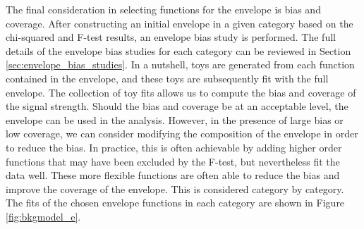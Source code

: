 The final consideration in selecting functions for the envelope is bias and coverage. After constructing an initial envelope in a given 
category based on the chi-squared and F-test results, an envelope bias study is performed. The full details of the envelope 
bias studies for each category can be reviewed in Section \ref{sec:envelope_bias_studies}. In a nutshell, toys are generated from 
each function contained in the envelope, and these toys are subsequently fit with the full envelope. The collection of toy fits
allows us to compute the bias and coverage of the signal strength. Should the bias and coverage be at an acceptable level, the 
envelope can be used in the analysis. However, in the presence of large bias or low coverage, we can consider modifying the 
composition of the envelope in order to reduce the bias. In practice, this is often achievable by adding higher order functions that 
may have been excluded by the F-test, but nevertheless fit the data well. These more flexible functions are often able to reduce the 
bias and improve the coverage of the envelope. This is considered category by category.
The fits of the chosen envelope functions in each category are shown in Figure \ref{fig:bkgmodel_e}.

